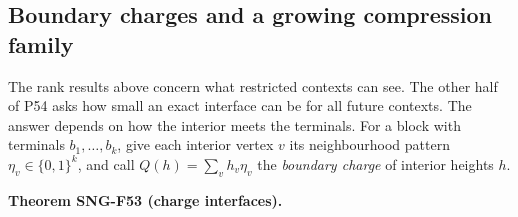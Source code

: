 \documentclass[
  11pt,
  a4paper,
]{report}
\begin{document}
\hypertarget{boundary-charges-and-a-growing-compression-family}{%
\subsection{Boundary charges and a growing compression
family}\label{boundary-charges-and-a-growing-compression-family}}

The rank results above concern what restricted contexts can see. The
other half of P54 asks how small an exact interface can be for all
future contexts. The answer depends on how the interior meets the
terminals. For a block with terminals \(b_1,\ldots,b_k\), give each
interior vertex \(v\) its neighbourhood pattern \(\eta_v\in\{0,1\}^k\),
and call \(Q(h)=\sum_vh_v\eta_v\) the \emph{boundary charge} of interior
heights \(h\).

\textbf{Theorem SNG-F53 (charge interfaces).}
\end{document}
